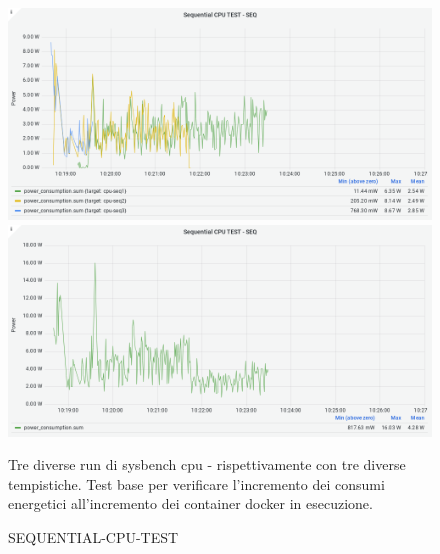 \documentclass[10pt,a4paper]{article}
\begin{document}
\begin{figure}[h]
\caption{SEQUENTIAL-CPU-TEST}
\centering
\includegraphics[scale=0.4]{image25}
\includegraphics[scale=0.4]{image34}
\begin{flushleft}
Tre diverse run di sysbench cpu - rispettivamente con tre diverse tempistiche. Test base per verificare l'incremento dei consumi energetici all'incremento dei container docker in esecuzione.
\end{flushleft}
\end{figure}
\end{document}
